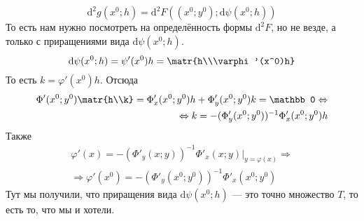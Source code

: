 \documentclass{article}
\begin{document}
\begin{itemize}
\begin{Proof}
            $$
            \mathrm d^2g(x^0;h)=\mathrm d^2F((x^0;y^0);\mathrm d\psi(x^0;h))
            $$
            То есть нам нужно посмотреть на определённость формы $\mathrm d^2F$, но не везде, а только с приращениями вида $\mathrm d\psi(x^0;h)$.
            $$
            \mathrm d\psi(x^0;h)=\psi'(x^0)h=\matr{h\\\varphi'(x^0)h}
            $$
            То есть $k=\varphi'(x^0)h$. Отсюда
            \[\begin{split}
                \Phi'(x^0;y^0)\matr{h\\k}=\Phi'_x(x^0;y^0)h+\Phi'_y(x^0;y^0)k=\mathbb0\Leftrightarrow\\\Leftrightarrow
                k=-(\Phi'_y(x^0;y^0))^{-1}\Phi'_x(x^0;y^0)h
            \end{split}\]
            Также
            \[\begin{split}
                \varphi'(x)=-(\Phi'_y(x;y))^{-1}\Phi'_x(x;y)\Big|_{y=\varphi(x)}\Rightarrow\\\Rightarrow
                \varphi'(x^0)=-(\Phi'_y(x^0;y^0))^{-1}\Phi'_x(x^0;y^0)
            \end{split}\]
            Тут мы получили, что приращения вида $\mathrm d\psi(x^0;h)$ --- это точно множество $T$, то есть то, что мы и хотели.
        \end{Proof}
    \end{itemize}
\end{document}
